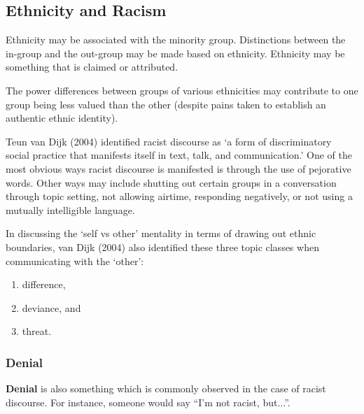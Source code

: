 \documentclass[../main.tex]{subfiles}
\begin{document}
    \subsection{Ethnicity and Racism}
    Ethnicity may be associated with the minority group. Distinctions between the in-group and the out-group may be made based on ethnicity. Ethnicity may be something that is claimed or attributed. \par
    The power differences between groups of various ethnicities may contribute to one group being less valued than the other (despite pains taken to establish an authentic ethnic identity). \par
    Teun van Dijk (2004) identified racist discourse as `a form of discriminatory social practice that manifests itself in text, talk, and communication.' One of the most obvious ways racist discourse is manifested is through the use of pejorative words. Other ways may include shutting out certain groups in a conversation through topic setting, not allowing airtime, responding negatively, or not using a mutually intelligible language. \par
    In discussing the `self vs other' mentality in terms of drawing out ethnic boundaries, van Dijk (2004) also identified these three topic classes when communicating with the `other': \begin{enumerate}
        \item difference,
        \item deviance, and
        \item threat.
    \end{enumerate}
    
    \subsubsection{Denial}
    \textbf{Denial} is also something which is commonly observed in the case of racist discourse. For instance, someone would say ``I'm not racist, but...''. 
\end{document}

